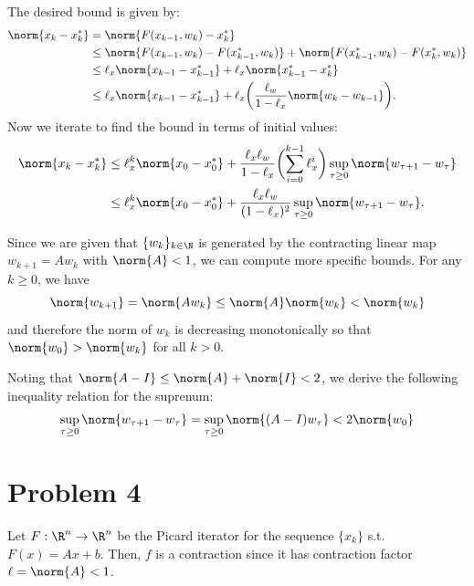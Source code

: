 \documentclass{homework}
\begin{document}
The desired bound is given by:
\begin{align}
    \norm{x_k - x_k^*} &= \norm{F(x_{k-1}, w_k) - x_k^*} \\
        &\leq \norm{F(x_{k-1}, w_k) - F(x_{k-1}^*, w_k)}
            + \norm{F(x_{k-1}^*, w_k) - F(x_k^*, w_k)} \\
        &\leq \ell_x \norm{x_{k-1} - x_{k-1}^*}
            + \ell_x \norm{x_{k-1}^* - x_k^*} \\
        &\leq \ell_x \norm{x_{k-1} - x_{k-1}^*}
            + \ell_x \biggl(
                \frac{\ell_w}{1 - \ell_x} \norm{w_k - w_{k-1}}
            \biggr).
\end{align}
Now we iterate to find the bound in terms of initial values:
\begin{align}
    \norm{x_k - x_k^*} &\leq \ell_x^k \norm{x_0 - x_0^*}
            + \frac{\ell_x \ell_w}{1 - \ell_x} \biggl(
                \sum_{i=0}^{k-1} \ell_x^i
            \biggr) \sup_{\tau \geq 0} \norm{w_{\tau + 1} - w_\tau} \\
        &\leq \ell_x^k \norm{x_0 - x_0^*}
        + \frac{\ell_x \ell_w}{(1 - \ell_x)^2}
            \sup_{\tau \geq 0} \norm{w_{\tau + 1} - w_\tau}.
\end{align}

Since we are given that $\{w_k\}_{k\in\N}$ is generated by the contracting
linear map $w_{k+1} = Aw_k$ with $\norm{A} < 1$, we can compute more specific
bounds. For any $k\geq0$, we have
\begin{equation}
    \norm{w_{k+1}} = \norm{Aw_k} \leq \norm{A}\norm{w_k} < \norm{w_k}
\end{equation}
and therefore the norm of $w_k$ is decreasing monotonically so that
$\norm{w_0} > \norm{w_k}$ for all $k>0$.

Noting that $\norm{A - I} \leq \norm{A} + \norm{I} < 2$, we derive
the following inequality relation for the suprenum:
\begin{equation}
    \sup_{\tau \geq 0} \norm{w_{\tau + 1} - w_\tau}
        = \sup_{\tau\geq0} \norm{(A - I)w_\tau} < 2 \norm{w_0}
\end{equation}

\section{Problem 4}
Let $F: \R^n \to \R^n$ be the Picard iterator for the sequence $\{x_k\}$
s.t. $F(x) = Ax + b$. Then, $f$ is a contraction since it has contraction
factor $\ell = \norm{A} < 1$.
\end{document}
